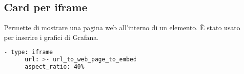 \subsection*{Card per iframe}
\label{sec:hass-appendix-plancia-iframe}
Permette di mostrare una pagina web all'interno di un elemento.
È stato usato per inserire i grafici di Grafana.
\begin{lstlisting}[language=bash]
    - type: iframe
      url: >- url_to_web_page_to_embed
      aspect_ratio: 40% 
\end{lstlisting}
